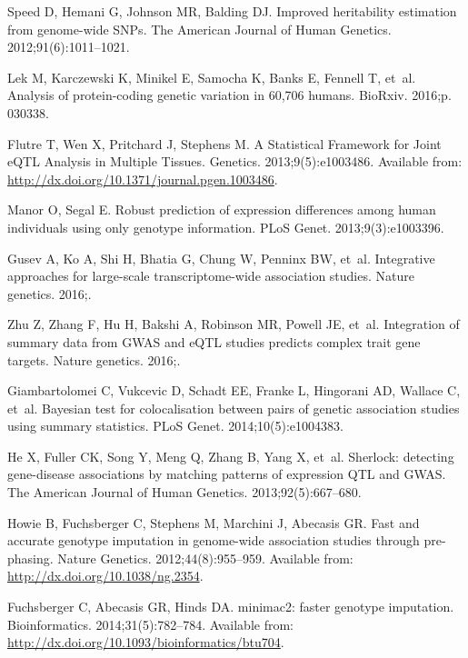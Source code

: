 \documentclass[10pt,letterpaper]{article}
\begin{document}
\begin{thebibliography}{10}
Speed D, Hemani G, Johnson MR, Balding DJ.
\newblock Improved heritability estimation from genome-wide SNPs.
\newblock The American Journal of Human Genetics. 2012;91(6):1011--1021.

Lek M, Karczewski K, Minikel E, Samocha K, Banks E, Fennell T, et~al.
\newblock Analysis of protein-coding genetic variation in 60,706 humans.
\newblock BioRxiv. 2016;p. 030338.

Flutre T, Wen X, Pritchard J, Stephens M.
\newblock A Statistical Framework for Joint {eQTL} Analysis in Multiple
  Tissues.
 Genetics. 2013;9(5):e1003486.
\newblock Available from: \url{http://dx.doi.org/10.1371/journal.pgen.1003486}.

Manor O, Segal E.
\newblock Robust prediction of expression differences among human individuals
  using only genotype information.
\newblock PLoS Genet. 2013;9(3):e1003396.

Gusev A, Ko A, Shi H, Bhatia G, Chung W, Penninx BW, et~al.
\newblock Integrative approaches for large-scale transcriptome-wide association
  studies.
\newblock Nature genetics. 2016;.

Zhu Z, Zhang F, Hu H, Bakshi A, Robinson MR, Powell JE, et~al.
\newblock Integration of summary data from GWAS and eQTL studies predicts
  complex trait gene targets.
\newblock Nature genetics. 2016;.

Giambartolomei C, Vukcevic D, Schadt EE, Franke L, Hingorani AD, Wallace C,
  et~al.
\newblock Bayesian test for colocalisation between pairs of genetic association
  studies using summary statistics.
\newblock PLoS Genet. 2014;10(5):e1004383.

He X, Fuller CK, Song Y, Meng Q, Zhang B, Yang X, et~al.
\newblock Sherlock: detecting gene-disease associations by matching patterns of
  expression QTL and GWAS.
\newblock The American Journal of Human Genetics. 2013;92(5):667--680.

Howie B, Fuchsberger C, Stephens M, Marchini J, Abecasis GR.
\newblock Fast and accurate genotype imputation in genome-wide association
  studies through pre-phasing.
\newblock Nature Genetics. 2012;44(8):955--959.
\newblock Available from: \url{http://dx.doi.org/10.1038/ng.2354}.

Fuchsberger C, Abecasis GR, Hinds DA.
\newblock minimac2: faster genotype imputation.
\newblock Bioinformatics. 2014;31(5):782--784.
\newblock Available from:
  \url{http://dx.doi.org/10.1093/bioinformatics/btu704}.


\end{thebibliography}
\end{document}
